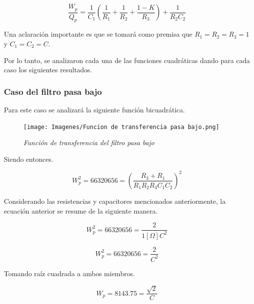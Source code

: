 \documentclass[12pt,A4paper,titlepage]{article}
\begin{document}
\begin{equation}
    \frac{W_p}{Q_p} = \frac{1}{C_1}(\frac{1}{R_1} + \frac{1}{R_2} + \frac{1-K}{R_3}) + \frac{1}{R_2 C_2}
\end{equation}

\bigskip
\hspace{1mm} Una aclaración importante es que se tomará como premisa que \(R_1 = R_2 = R_3 = 1\) y \(C_1 = C_2 = C\).

\bigskip
\hspace{1mm} Por lo tanto, se analizaron cada una de las funciones cuadráticas dando para cada caso los siguientes resultados.

\subsubsection{Caso del filtro pasa bajo}
\hspace{1mm} Para este caso se analizará la siguiente función bicuadrática.

\begin{figure}[!h] 
  \centering
  \texttt{[image: Imagenes/Funcion de transferencia pasa bajo.png]}
  \caption{\textit{Función de transferencia del filtro pasa bajo}}
\end{figure}

\hspace{1mm} Siendo entonces.

\begin{equation}
    W_p^2 = 66 320 656 = (\frac{R_3 + R_1}{R_1 R_2 R_3 C_1 C_2})^2
\end{equation}

\bigskip
 \hspace{1mm} Considerando las resistencias y capacitores mencionados anteriormente, la ecuación anterior se resume de la siguiente manera.
 
 \begin{equation}
     W_p^2 = 66 320 656 = \frac{2}{1[\Omega] C^2}
 \end{equation}

\begin{equation}
    W_p^2= 66 320 656 = \frac{2}{C^2}
\end{equation}

\bigskip
\hspace{1mm} Tomando raíz cuadrada a ambos miembros.

\begin{equation}
    W_p = 8 143.75 = \frac{\sqrt{2}}{C}
\end{equation}
\end{document}

